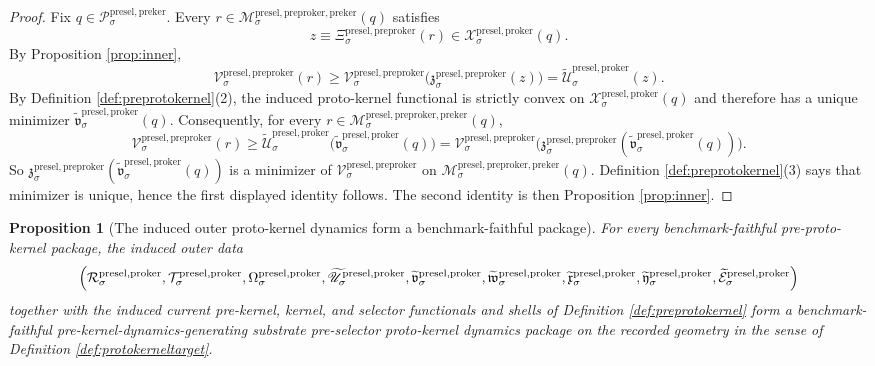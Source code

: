 \documentclass[11pt]{article}
\newcommand{\PreKernelBody}[1]{\mathcal P_{#1}^{\mathrm{presel,preker}}}
\newcommand{\ProtoKernelSpace}[1]{\mathcal R_{#1}^{\mathrm{presel,proker}}}
\newcommand{\ProtoKernelBody}[1]{\mathcal T_{#1}^{\mathrm{presel,proker}}}
\newcommand{\ProtoKernelProj}[1]{\Omega_{#1}^{\mathrm{presel,proker}}}
\newcommand{\ProtoKernelFiber}[2]{\mathcal X_{#1}^{\mathrm{presel,proker}}(#2)}
\newcommand{\PreProtoKernelProj}[1]{\Xi_{#1}^{\mathrm{presel,preproker}}}
\newcommand{\PreProtoKernelFunctional}[1]{\mathscr V_{#1}^{\mathrm{presel,preproker}}}
\newcommand{\PreProtoKernelMinLift}[1]{\mathfrak z_{#1}^{\mathrm{presel,preproker}}}
\newcommand{\PreProtoKernelPreKernelFiber}[2]{\mathcal M_{#1}^{\mathrm{presel,preproker,preker}}(#2)}
\newcommand{\InducedProtoKernelFunctional}[1]{\widetilde{\mathscr U}_{#1}^{\mathrm{presel,proker}}}
\newcommand{\InducedProtoKernelMinLift}[1]{\widetilde{\mathfrak v}_{#1}^{\mathrm{presel,proker}}}
\newcommand{\InducedProtoKernelKernelMin}[1]{\widetilde{\mathfrak w}_{#1}^{\mathrm{presel,proker}}}
\newcommand{\InducedProtoKernelSelectorMin}[1]{\widetilde{\mathfrak x}_{#1}^{\mathrm{presel,proker}}}
\newcommand{\InducedProtoKernelFullMin}[1]{\widetilde{\mathfrak y}_{#1}^{\mathrm{presel,proker}}}
\newcommand{\InducedProtoKernelShell}[1]{\widetilde{\mathcal E}_{#1}^{\mathrm{presel,proker}}}
\newtheorem{proposition}{Proposition}
\begin{document}
\begin{proof}
Fix \(q\in\PreKernelBody{\sigma}\). Every \(r\in\PreProtoKernelPreKernelFiber{\sigma}{q}\) satisfies
\[
z\equiv\PreProtoKernelProj{\sigma}(r)\in\ProtoKernelFiber{\sigma}{q}.
\]
By Proposition \ref{prop:inner},
\[
\PreProtoKernelFunctional{\sigma}(r)
\geq
\PreProtoKernelFunctional{\sigma}\bigl(\PreProtoKernelMinLift{\sigma}(z)\bigr)
=
\InducedProtoKernelFunctional{\sigma}(z).
\]
By Definition \ref{def:preprotokernel}(2), the induced proto-kernel functional is strictly convex on \(\ProtoKernelFiber{\sigma}{q}\) and therefore has a unique minimizer \(\InducedProtoKernelMinLift{\sigma}(q)\). Consequently, for every \(r\in\PreProtoKernelPreKernelFiber{\sigma}{q}\),
\[
\PreProtoKernelFunctional{\sigma}(r)
\geq
\InducedProtoKernelFunctional{\sigma}\bigl(\InducedProtoKernelMinLift{\sigma}(q)\bigr)
=
\PreProtoKernelFunctional{\sigma}\bigl(\PreProtoKernelMinLift{\sigma}(\InducedProtoKernelMinLift{\sigma}(q))\bigr).
\]
So \(\PreProtoKernelMinLift{\sigma}(\InducedProtoKernelMinLift{\sigma}(q))\) is a minimizer of \(\PreProtoKernelFunctional{\sigma}\) on \(\PreProtoKernelPreKernelFiber{\sigma}{q}\). Definition \ref{def:preprotokernel}(3) says that minimizer is unique, hence the first displayed identity follows. The second identity is then Proposition \ref{prop:inner}.
\end{proof}

\begin{proposition}[The induced outer proto-kernel dynamics form a benchmark-faithful package]
\label{prop:protokernel}
For every benchmark-faithful pre-proto-kernel package, the induced outer data
\[
\Bigl(
\ProtoKernelSpace{\sigma},
\ProtoKernelBody{\sigma},
\ProtoKernelProj{\sigma},
\InducedProtoKernelFunctional{\sigma},
\InducedProtoKernelMinLift{\sigma},
\InducedProtoKernelKernelMin{\sigma},
\InducedProtoKernelSelectorMin{\sigma},
\InducedProtoKernelFullMin{\sigma},
\InducedProtoKernelShell{\sigma}
\Bigr)
\]
together with the induced current pre-kernel, kernel, and selector functionals and shells of Definition \ref{def:preprotokernel} form a benchmark-faithful pre-kernel-dynamics-generating substrate pre-selector proto-kernel dynamics package on the recorded geometry in the sense of Definition \ref{def:protokerneltarget}.
\end{proposition}
\end{document}
